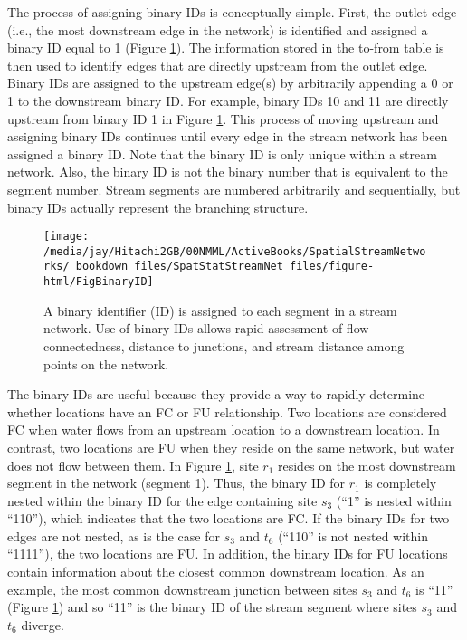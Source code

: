 \documentclass[]{book}
\theoremstyle{definition}
\theoremstyle{definition}
\theoremstyle{definition}
\theoremstyle{remark}
\begin{document}
The process of assigning binary IDs is conceptually simple. First, the
outlet edge (i.e., the most downstream edge in the network) is
identified and assigned a binary ID equal to 1 (Figure
\ref{fig:FigBinaryID}). The information stored in the to-from table is
then used to identify edges that are directly upstream from the outlet
edge. Binary IDs are assigned to the upstream edge(s) by arbitrarily
appending a 0 or 1 to the downstream binary ID. For example, binary IDs
10 and 11 are directly upstream from binary ID 1 in Figure
\ref{fig:FigBinaryID}. This process of moving upstream and assigning
binary IDs continues until every edge in the stream network has been
assigned a binary ID. Note that the binary ID is only unique within a
stream network. Also, the binary ID is not the binary number that is
equivalent to the segment number. Stream segments are numbered
arbitrarily and sequentially, but binary IDs actually represent the
branching structure.

\begin{figure}[h]

{\centering \texttt{[image: /media/jay/Hitachi2GB/00NMML/ActiveBooks/SpatialStreamNetworks/\_bookdown\_files/SpatStatStreamNet\_files/figure-html/FigBinaryID]} 

}

\caption{A binary identifier (ID) is assigned to each segment in a stream network.  Use of binary IDs allows rapid assessment of flow-connectedness, distance to junctions, and stream distance among points on the network.}\label{fig:FigBinaryID}
\end{figure}

The binary IDs are useful because they provide a way to rapidly
determine whether locations have an FC or FU relationship. Two locations
are considered FC when water flows from an upstream location to a
downstream location. In contrast, two locations are FU when they reside
on the same network, but water does not flow between them. In Figure
\ref{fig:FigBinaryID}, site \(r_1\) resides on the most downstream
segment in the network (segment 1). Thus, the binary ID for \(r_1\) is
completely nested within the binary ID for the edge containing site
\(s_3\) (``1'' is nested within ``110''), which indicates that the two
locations are FC. If the binary IDs for two edges are not nested, as is
the case for \(s_3\) and \(t_6\) (``110'' is not nested within
``1111''), the two locations are FU. In addition, the binary IDs for FU
locations contain information about the closest common downstream
location. As an example, the most common downstream junction between
sites \(s_3\) and \(t_6\) is ``11'' (Figure \ref{fig:FigBinaryID}) and
so ``11'' is the binary ID of the stream segment where sites \(s_3\) and
\(t_6\) diverge.
\end{document}
